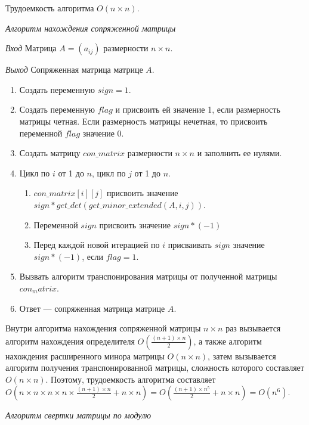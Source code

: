 \documentclass[bachelor, och, labwork]{shiza}
\begin{document}
Трудоемкость алгоритма $O(n \times n)$.

\begin{center}
    \textit{Алгоритм нахождения сопряженной матрицы}
\end{center}

\textit{Вход} Матрица $A = (a_{ij})$ размерности $n \times n$.

\textit{Выход} Сопряженная матрица матрице $A$.

\begin{enumerate}
    \item Создать переменную $sign=1$.
    \item Создать переменную $flag$ и присвоить ей значение 1, если размерность 
    матрицы четная. Если размерность матрицы нечетная, то присвоить переменной $flag$
    значение 0.
    \item Создать матрицу $con\_matrix$ размерности $n \times n$
    и заполнить ее нулями.
    \item Цикл по $i$ от 1 до $n$, цикл по $j$ от 1 до $n$.
        \begin{enumerate}
            \item $con\_matrix[i][j]$ присвоить значение $sign * get\_det(get\_minor\_extended(A, i, j))$.
            \item Переменной $sign$ присвоить значение $sign * (-1)$
            \item Перед каждой новой итерацией по $i$ присваивать $sign$ значение $sign * (-1)$, 
            если $flag = 1$.
        \end{enumerate}
    \item Вызвать алгоритм транспонирования матрицы от полученной матрицы $con_matrix$.

    \item Ответ --- сопряженная матрица матрице $A$.
\end{enumerate}

Внутри алгоритма нахождения сопряженной матрицы $n \times n$ раз вызывается алгоритм 
нахождения определителя $O(\frac{(n + 1)\times n }{2})$, а также алгоритм нахождения расширенного 
минора матрицы $O(n \times n)$, затем вызывается алгоритм получения транспонированной 
матрицы, сложность которого составляет $O(n \times n)$. Поэтому, трудоемкость алгоритма
составляет $O(n \times n \times n \times n \times \frac{(n + 1)\times n }{2} + n \times n) = O(\frac{(n + 1)\times n^5}{2} + n \times n) = O(n ^ 6)$.


\begin{center}
    \textit{Алгоритм свертки матрицы по модулю}
\end{center}
\end{document}
